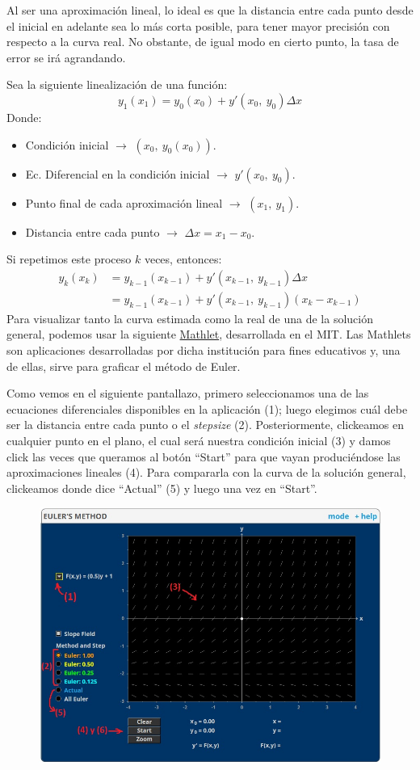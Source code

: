 \documentclass[12pt]{article}
\begin{document}
Al ser una aproximación lineal, lo ideal es que la distancia entre cada punto desde el inicial en adelante sea lo más corta posible, para tener mayor precisión con respecto a la curva real. No obstante, de igual modo en cierto punto, la tasa de error se irá agrandando.

Sea la siguiente linealización de una función:
\[
  y_{1}(x_{1}) = y_{0}(x_{0}) + y'(x_{0}, \ y_{0}) \Delta x
\]
Donde:

\begin{itemize}
\item Condición inicial $\rightarrow$ $(x_{0}, \ y_{0}(x_{0}))$.
\item Ec. Diferencial en la condición inicial $\rightarrow$ $y'(x_{0}, \ y_{0})$.
\item Punto final de cada aproximación lineal $\rightarrow$ $(x_{1}, \ y_{1})$.
\item Distancia entre cada punto $\rightarrow$ $\Delta x = x_{1} - x_{0}$.
\end{itemize}

Si repetimos este proceso $k$ veces, entonces:
\begin{align*}
  y_{k}(x_{k}) &= y_{k-1}(x_{k-1}) + y'(x_{k-1}, \ y_{k-1}) \Delta x \\
               &= y_{k-1}(x_{k-1}) + y'(x_{k-1}, \ y_{k-1}) (x_{k} - x_{k-1})
\end{align*}
Para visualizar tanto la curva estimada como la real de una de la solución general, podemos usar la siguiente \href{https://mathlets.org/mathlets/eulers-method/}{Mathlet}, desarrollada en el MIT. Las Mathlets son aplicaciones desarrolladas por dicha institución para fines educativos y, una de ellas, sirve para graficar el método de Euler.

Como vemos en el siguiente pantallazo, primero seleccionamos una de las ecuaciones diferenciales disponibles en la aplicación (1); luego elegimos cuál debe ser la distancia entre cada punto o el \textit{stepsize} (2). Posteriormente, clickeamos en cualquier punto en el plano, el cual será nuestra condición inicial (3) y damos click las veces que queramos al botón ``Start'' para que vayan produciéndose las aproximaciones lineales (4). Para compararla con la curva de la solución general, clickeamos donde dice ``Actual'' (5) y luego una vez en ``Start''.

\begin{figure}[hbt!]
\centering
\includegraphics[scale=0.5]{img/screenshot-euler-meth-mathlet.jpg}
\end{figure}
\end{document}
